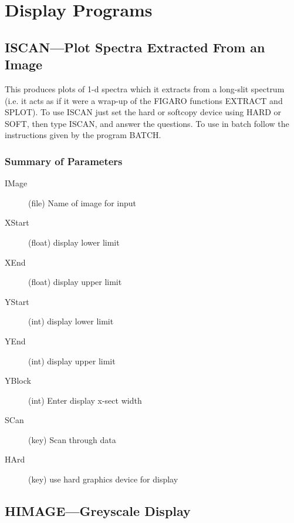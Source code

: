 \section{Display Programs}

\subsection{ISCAN---Plot Spectra Extracted From an Image}

This produces plots of 1-d spectra which it extracts from a long-slit
spectrum (i.e. it acts as if it were a wrap-up of the FIGARO functions
EXTRACT and SPLOT).
To use ISCAN just set the hard or softcopy device using HARD or SOFT,
then type ISCAN, and answer the questions. To use in batch follow the
instructions given by the program BATCH.

\subsubsection{Summary of Parameters}

\begin{description}
\item[IMage] (file) Name of image for input
\item[XStart] (float) display lower limit
\item[XEnd] (float) display upper limit
\item[YStart] (int) display lower limit
\item[YEnd] (int) display upper limit
\item[YBlock] (int) Enter display x-sect width
\item[SCan] (key) Scan through data
\item[HArd] (key) use hard graphics device for display
\end{description}

\subsection{HIMAGE---Greyscale Display}


